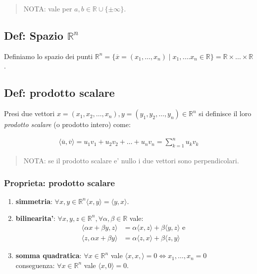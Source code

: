 \documentclass{article}
\begin{document}
\begin{quote}
  NOTA: vale per $a, b \in \mathbb{R} \cup \{ \pm \infty \}$.
\end{quote}

\subsection{Def: Spazio $\mathbb{R}^n$}

Definiamo lo spazio dei punti $\mathbb{R}^n = \{ \overline{x} = (x_1, \ldots, x_n)
\mid x_1, \ldots. x_n \in \mathbb{R} \} = \mathbb{R} \times \ldots \times \mathbb{R}$.

\subsection{Def: prodotto scalare}

Presi due vettori $x = (x_1, x_2, \ldots, x_n), y = (y_1, y_2, \ldots, y_n) \in \mathbb{R}^n$
si definisce il loro \emph{prodotto scalare} (o prodotto intero) come:

\begin{align*}
  \langle \overline{u}, \overline{v} \rangle = u_1 v_1 + u_2 v_2 + \ldots + u_n v_n = \sum_{k=1}^n u_k v_k
\end{align*}

\begin{quote}
  NOTA: se il prodotto scalare e' nullo i due vettori sono perpendicolari.
\end{quote}

\subsubsection{Proprieta: prodotto scalare}

\begin{enumerate}
  \item \textbf{simmetria}: $\forall x, y \in \mathbb{R}^n \langle x, y \rangle = \langle y, x \rangle$.
  \item \textbf{bilinearita'}: $\forall x, y, z \in \mathbb{R}^n, \forall \alpha, \beta \in \mathbb{R}$ vale:
    \begin{align*}
      \langle \alpha x + \beta y, z \rangle &= \alpha \langle x, z \rangle + \beta \langle y, z \rangle \text{ e } \\
      \langle z, \alpha x + \beta y \rangle &= \alpha \langle z, x \rangle + \beta \langle z, y \rangle
    \end{align*}
  \item \textbf{somma quadratica}: $\forall x \in \mathbb{R}^n$ vale $\langle x, x, \rangle = 0 \iff x_1, \ldots, x_n = 0$ \\
    conseguenza: $\forall x \in \mathbb{R}^n$ vale $\langle x, 0 \rangle = 0$.
\end{enumerate}
\end{document}

